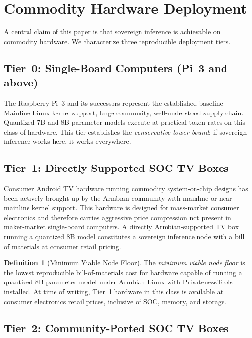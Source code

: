 \documentclass[11pt,a4paper]{article}
\theoremstyle{definition}
\newtheorem{definition}{Definition}[section]
\begin{document}
\section{Commodity Hardware Deployment}
\label{sec:hardware}

A central claim of this paper is that sovereign inference is achievable on
commodity hardware.  We characterize three reproducible deployment tiers.

\subsection{Tier~0: Single-Board Computers (Pi~3 and above)}

The Raspberry Pi~3 and its successors represent the established baseline.
Mainline Linux kernel support, large community, well-understood supply chain.
Quantized 7B and 8B parameter models execute at practical token rates on
this class of hardware.  This tier establishes the \emph{conservative lower
bound}: if sovereign inference works here, it works everywhere.

\subsection{Tier~1: Directly Supported SOC TV Boxes}

Consumer Android TV hardware running commodity system-on-chip designs has
been actively brought up by the Armbian community \cite{armbian} with
mainline or near-mainline kernel support.  This hardware is designed for
mass-market consumer electronics and therefore carries aggressive price
compression not present in maker-market single-board computers.  A directly
Armbian-supported TV box running a quantized 8B model constitutes a sovereign
inference node with a bill of materials at consumer
retail pricing.

\begin{definition}[Minimum Viable Node Floor]
The \emph{minimum viable node floor} is the lowest reproducible bill-of-materials
cost for hardware capable of running a quantized 8B parameter model under
Armbian Linux with PrivatenessTools installed.  At time of writing, Tier~1
hardware in this class is available at consumer electronics retail prices,
inclusive of SOC, memory, and storage.
\end{definition}

\subsection{Tier~2: Community-Ported SOC TV Boxes}
\end{document}
